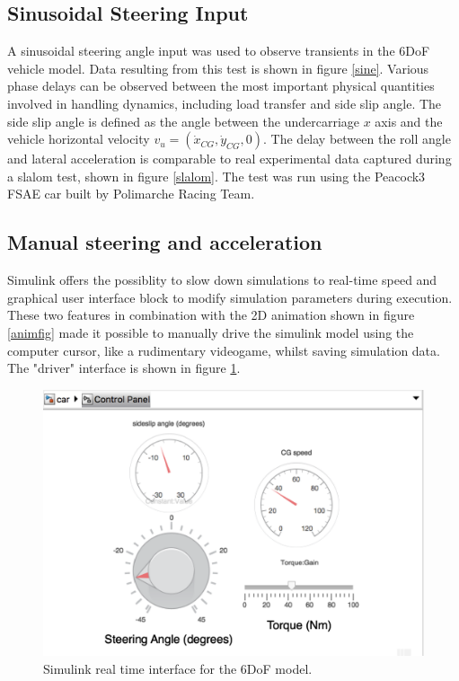 \subsection{Sinusoidal Steering Input}
A sinusoidal steering angle input was used to observe transients in the 6DoF vehicle model. Data resulting from this test is shown in figure \ref{sine}. Various phase delays can be observed between the most important physical quantities involved in handling dynamics, including load transfer and side slip angle. The side slip angle is defined as the angle between the undercarriage $x$ axis and the vehicle horizontal velocity $v_u = (\dot x_{CG}, \dot y_{CG}, 0)$. The delay between the roll angle and lateral acceleration is comparable to real experimental data captured during a slalom test, shown in figure \ref{slalom}. The test was run using the Peacock3 FSAE car built by Polimarche Racing Team.

\subsection{Manual steering and acceleration}
Simulink offers the possiblity to slow down simulations to real-time speed and
graphical user interface block to modify simulation parameters during execution. These two features in combination with the 2D animation shown in figure \ref{animfig} made it possible to manually drive the simulink model using the computer cursor, like a rudimentary videogame, whilst saving simulation data. The "driver" interface is shown in figure \ref{12mask}.

\begin{figure}[h]
    \centering
    \includegraphics[scale=0.5]{images/controlpanel.png}
    \caption{Simulink real time interface for the 6DoF model.}
	\label{12mask}
\end{figure}


